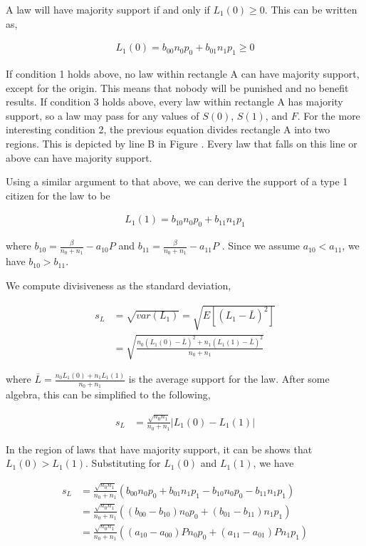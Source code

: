 A law will have majority support if and only if $L_1(0) \geq 0$.  This can be written as,

\begin{align}
L_1(0) = b_{00}n_0p_0 + b_{01} n_1p_1 \geq 0
\end{align}

If condition 1 holds above, no law within rectangle A can have majority support, except for the origin.  This means that nobody will be punished and no benefit results.  If condition 3 holds above, every law within rectangle A has majority support, so a law may pass for any values of $S(0)$, $S(1)$, and $F$.  For the more interesting condition 2, the previous equation divides rectangle A into two regions.  This is depicted by line B in Figure .  Every law that falls on this line or above can have majority support.

Using a similar argument to that above, we can derive the support of a type 1 citizen for the law to be

\begin{align}
L_1(1) =  b_{10} n_0p_0 + b_{11}n_1p_1
\end{align}

where $b_{10} = \frac{\beta}{n_0 + n_1} -   a_{10}P$ and $b_{11} = \frac{\beta }{n_0 + n_1} -  a_{11}P $ .  Since we assume $a_{10} < a_{11}$, we have $b_{10} > b_{11}$.

We compute divisiveness as the standard deviation,

\begin{align}
s_L &= \sqrt{var(L_1)}  =  \sqrt{E\left[ \left(L_1 - \bar{L} \right)^2 \right] }  \\
&= \sqrt{ \frac{ n_0\left(L_1(0) - \bar{L}\right)^2 + n_1\left(L_1(1) - \bar{L} \right)^2 }{n_0+n_1}  }
\end{align}

where $\bar{L} = \frac{n_0 L_1(0) + n_1L_1(1) }{n_0 + n_1}$ is the average support for the law.  After some algebra, this can be simplified to the following,

\begin{align}
s_L &= \frac{\sqrt{n_0n_1}}{n_0 + n_1} \left| L_1(0) - L_1(1) \right|
\end{align}

In the region of laws that have majority support, it can be shows that $L_1(0) > L_1(1)$. Substituting for $L_1(0)$ and $L_1(1)$, we have

\begin{align}
s_L &= \frac{\sqrt{n_0n_1}}{n_0 + n_1} \left(  b_{00}n_0p_0 + b_{01} n_1p_1 - b_{10} n_0p_0 - b_{11}n_1p_1 \right) \\
&= \frac{\sqrt{n_0n_1}}{n_0 + n_1} \left(  ( b_{00} - b_{10} )n_0p_0 + ( b_{01} - b_{11})n_1p_1 \right) \\
&= \frac{\sqrt{n_0n_1}}{n_0 + n_1} \left(  ( a_{10} - a_{00} )P n_0p_0 + ( a_{11} - a_{01})P n_1p_1 \right) \\
\end{align}

